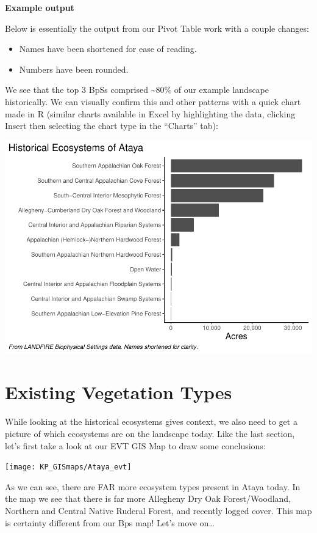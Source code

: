 \documentclass[
]{book}
\providecommand{\tightlist}{%
  \setlength{\itemsep}{0pt}\setlength{\parskip}{0pt}}
\begin{document}
\textbf{Example output}

Below is essentially the output from our Pivot Table work with a couple changes:

\begin{itemize}
\tightlist
\item
  Names have been shortened for ease of reading.
\item
  Numbers have been rounded.
\end{itemize}

We see that the top 3 BpSs comprised \textasciitilde80\% of our example landscape historically. We can visually confirm this and other patterns with a quick chart made in R (similar charts available in Excel by highlighting the data, clicking Insert then selecting the chart type in the ``Charts'' tab):

\includegraphics{FSCBook_files/figure-latex/bpsChart-1.pdf}

\hypertarget{evt}{%
\chapter{Existing Vegetation Types}\label{evt}}

While looking at the historical ecosystems gives context, we also need to get a picture of which ecosystems are on the landscape today. Like the last section, let's first take a look at our EVT GIS Map to draw some conclusions:

\texttt{[image: KP\_GISmaps/Ataya\_evt]}

As we can see, there are FAR more ecosystem types present in Ataya today. In the map we see that there is far more Allegheny Dry Oak Forest/Woodland, Northern and Central Native Ruderal Forest, and recently logged cover. This map is certainty different from our Bps map! Let's move on\ldots{}
\end{document}
